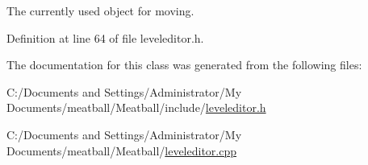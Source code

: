 The currently used object for moving. 



Definition at line 64 of file leveleditor.\-h.



The documentation for this class was generated from the following files\-:\begin{DoxyCompactItemize}
\item 
C\-:/\-Documents and Settings/\-Administrator/\-My Documents/meatball/\-Meatball/include/\hyperlink{leveleditor_8h}{leveleditor.\-h}\item 
C\-:/\-Documents and Settings/\-Administrator/\-My Documents/meatball/\-Meatball/\hyperlink{leveleditor_8cpp}{leveleditor.\-cpp}\end{DoxyCompactItemize}
